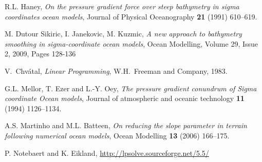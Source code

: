 \documentclass[12pt]{article}
\begin{document}
%








\begin{thebibliography}{WWw99}
R.L. Haney, {\em On the pressure gradient force over steep bathymetry in sigma coordinates ocean models}, Journal of Physical Oceanography {\bf 21} (1991) 610--619.


M. Dutour Sikiric, I. Janekovic, M. Kuzmic, {\em A new approach to bathymetry smoothing in sigma-coordinate ocean models}, 
Ocean Modelling, Volume 29, Issue 2, 2009, Pages 128-136

V.~Chv{\'a}tal, {\em Linear Programming}, W.H.~Freeman and Company, 1983.

G.L. Mellor, T. Ezer and L.-Y. Oey, {\em The pressure gradient conundrum of Sigma coordinate Ocean models}, Journal of atmospheric and oceanic technology {\bf 11} (1994) 1126--1134.

A.S. Martinho and M.L. Batteen, {\em On reducing the slope parameter in terrain following numerical ocean models}, Ocean Modelling {\bf 13} (2006) 166--175.


P. Notebaert and K. Eikland, \url{http://lpsolve.sourceforge.net/5.5/}

\end{thebibliography}
\end{document}
